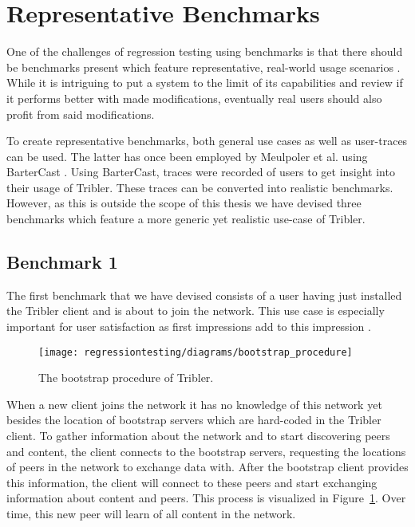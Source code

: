 \section{Representative Benchmarks}

One of the challenges of regression testing using benchmarks is that there should be benchmarks present which feature representative, real-world usage scenarios \cite{ferre2001usability}.
While it is intriguing to put a system to the limit of its capabilities and review if it performs better with made modifications, eventually real users should also profit from said modifications.

To create representative benchmarks, both general use cases as well as user-traces can be used.
The latter has once been employed by Meulpoler et al. using BarterCast \cite{meulpolder2009bartercast}.
Using BarterCast, traces were recorded of users to get insight into their usage of Tribler.
These traces can be converted into realistic benchmarks.
However, as this is outside the scope of this thesis we have devised three benchmarks which feature a more generic yet realistic use-case of Tribler.

\subsection{Benchmark 1}

The first benchmark that we have devised consists of a user having just installed the Tribler client and is about to join the network.
This use case is especially important for user satisfaction as first impressions add to this impression \cite{ferre2001usability}.

\begin{figure}[!h]
	\centering
	\texttt{[image: regressiontesting/diagrams/bootstrap\_procedure]}
	\caption{The bootstrap procedure of Tribler.}
	\label{fig:tribler_bootstrapping}
\end{figure}

When a new client joins the network it has no knowledge of this network yet besides the location of bootstrap servers which are hard-coded in the Tribler client.
To gather information about the network and to start discovering peers and content, the client connects to the bootstrap servers, requesting the locations of peers in the network to exchange data with.
After the bootstrap client provides this information, the client will connect to these peers and start exchanging information about content and peers.
This process is visualized in Figure~\ref{fig:tribler_bootstrapping}.
Over time, this new peer will learn of all content in the network.

